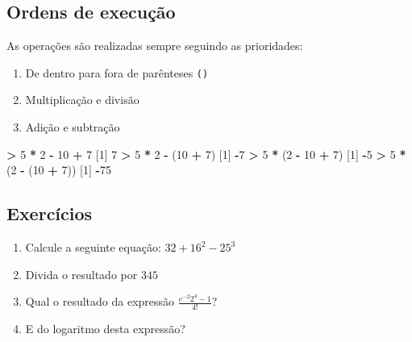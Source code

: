 \documentclass[10pt,a4paper]{book}
\newenvironment{Shaded}{\begin{snugshade}}{\end{snugshade}}
\newcommand{\DecValTok}[1]{\textcolor[rgb]{0.00,0.00,0.81}{#1}}
\newcommand{\StringTok}[1]{\textcolor[rgb]{0.31,0.60,0.02}{#1}}
\newcommand{\OperatorTok}[1]{\textcolor[rgb]{0.81,0.36,0.00}{\textbf{#1}}}
\newcommand{\NormalTok}[1]{#1}
\providecommand{\tightlist}{%
  \setlength{\itemsep}{0pt}\setlength{\parskip}{0pt}}
\begin{document}
\subsection{Ordens de execução}\label{ordens-de-execucao}

As operações são realizadas sempre seguindo as prioridades:

\begin{enumerate}
\def\labelenumi{\arabic{enumi}.}
\tightlist
\item
  De dentro para fora de parênteses \texttt{()}
\item
  Multiplicação e divisão
\item
  Adição e subtração
\end{enumerate}

\begin{Shaded}
\begin{Highlighting}[]
\OperatorTok{>}\StringTok{ }\DecValTok{5} \OperatorTok{*}\StringTok{ }\DecValTok{2} \OperatorTok{-}\StringTok{ }\DecValTok{10} \OperatorTok{+}\StringTok{ }\DecValTok{7}
\NormalTok{[}\DecValTok{1}\NormalTok{] }\DecValTok{7}
\OperatorTok{>}\StringTok{ }\DecValTok{5} \OperatorTok{*}\StringTok{ }\DecValTok{2} \OperatorTok{-}\StringTok{ }\NormalTok{(}\DecValTok{10} \OperatorTok{+}\StringTok{ }\DecValTok{7}\NormalTok{)}
\NormalTok{[}\DecValTok{1}\NormalTok{] }\OperatorTok{-}\DecValTok{7}
\OperatorTok{>}\StringTok{ }\DecValTok{5} \OperatorTok{*}\StringTok{ }\NormalTok{(}\DecValTok{2} \OperatorTok{-}\StringTok{ }\DecValTok{10} \OperatorTok{+}\StringTok{ }\DecValTok{7}\NormalTok{)}
\NormalTok{[}\DecValTok{1}\NormalTok{] }\OperatorTok{-}\DecValTok{5}
\OperatorTok{>}\StringTok{ }\DecValTok{5} \OperatorTok{*}\StringTok{ }\NormalTok{(}\DecValTok{2} \OperatorTok{-}\StringTok{ }\NormalTok{(}\DecValTok{10} \OperatorTok{+}\StringTok{ }\DecValTok{7}\NormalTok{))}
\NormalTok{[}\DecValTok{1}\NormalTok{] }\OperatorTok{-}\DecValTok{75}
\end{Highlighting}
\end{Shaded}

\subsection*{Exercícios}\label{exercicios}


\begin{enumerate}
\def\labelenumi{\arabic{enumi}.}
\tightlist
\item
  Calcule a seguinte equação: \(32 + 16^2 - 25^3\)
\item
  Divida o resultado por \(345\)
\item
  Qual o resultado da expressão \(\frac{e^{-2} 2^{4} - 1}{4!}\)?
\item
  E do logaritmo desta expressão?
\end{enumerate}
\end{document}
